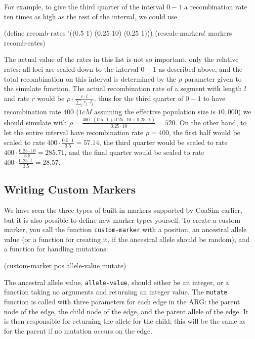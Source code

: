 \documentclass{manual}
\begin{document}
\begin{empfile}
For example, to give the third quarter of the interval $0-1$ a
recombination rate ten times as high as the rest of the interval, we
could use
\begin{code}
(define recomb-rates '((0.5 1) (0.25 10) (0.25 1)))
(rescale-markers! markers recomb-rates)
\end{code}

The actual value of the rates in this list is not so important, only
the relative rates: all loci are scaled down to the interval $0-1$ as
described above, and the total recombination on this interval is
determined by the $\rho$ parameter given to the simulate function.
The actual recombination rate of a segment with length $l$ and rate
$r$ would be $\rho\cdot\frac{r\cdot{}l}{\sum_jr_j\cdot{}l_j}$, thus
for the third quarter of $0-1$ to have recombination rate $400$ ($1cM$
assuming the effective population size is $10,000$) we should simulate
with $\rho=\frac{400\cdot{}(0.5\cdot{}1+0.25\cdot{}10+0.25\cdot{}1)}
                {0.25\cdot{}10}=
520$.  On the other hand, to let the entire interval have
recombination rate $\rho=400$, the first half would be scaled to rate
$400\cdot{}\frac{0.5\cdot{}1}{3.5}=57.14$, the third quarter would be
scaled to rate $400\cdot{}\frac{0.25\cdot{}10}{3.5}=285.71$, and the
final quarter would be scaled to rate
$400\cdot{}\frac{0.25\cdot{}1}{3.5}=28.57$.


\subsection{Writing Custom Markers}
\label{sec:writ-cust-mark}

We have seen the three types of built-in markers supported by CoaSim
earlier, but it is also possible to define new marker types yourself.
To create a custom marker, you call the function
\texttt{custom-marker} with a position, an ancestral allele value (or
a function for creating it, if the ancestral allele should be random),
and a function for handling mutations:
\begin{code}
(custom-marker pos allele-value mutate)
\end{code}
The ancestral allele value, \texttt{allele-value}, should either be an
integer, or a function taking no arguments and returning an integer
value.  The \texttt{mutate} function is called with three parameters
for each edge in the ARG: the parent node of the edge, the child node
of the edge, and the parent allele of the edge.  It is then responsible
for returning the allele for the child; this will be the same as for
the parent if no mutation occurs on the edge.


\end{empfile}
\end{document}
